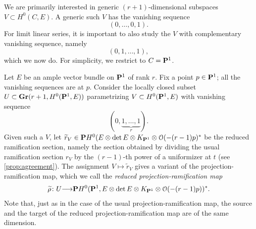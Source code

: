 \documentclass[11pt,reqno]{amsart}
\theoremstyle{plain}
\theoremstyle{definition}
\theoremstyle{remark}
\numberwithin{equation}{section}
\renewcommand{\to}{{\longrightarrow}}
\numberwithin{equation}{section}
\renewcommand{\O}{\mathcal O}
\begin{document}
We are primarily interested in generic $(r+1)$-dimensional subspaces $V \subset H^0(C, E)$.
A generic such $V$ has the vanishing sequence
\[ (0, \dots, 0, 1).\]
For limit linear series, it is important to also study the $V$ with complementary vanishing sequence, namely
\[ (0,1, \dots, 1),\]
which we now do.
For simplicity, we restrict to $C = \P^1$.

Let $E$ be an ample vector bundle on $\P^1$ of rank $r$.
Fix a point $p \in \P^1$; all the vanishing sequences are at $p$.
Consider  the locally closed subset $U \subset \Gr(r+1, H^0(\P^1, E))$ parametrizing $V \subset H^0(\P^1, E)$ with vanishing sequence
\[ (0,\underbrace{1,\dots, 1}_{r}).\]
Given such a $V$, let $\widetilde r_V \in \P H^0(E \otimes \det E \otimes K_{\P^1} \otimes \O(-(r-1)p)^*$ be the reduced ramification section, namely the section obtained by dividing the usual ramification section $r_V$ by the $(r-1)$-th power of a uniformizer at $t$ (see \autoref{prop:agreement}).
The assignment $V \mapsto \widetilde r_V$ gives a variant of the projection-ramification map, which we call the \emph{reduced projection-ramification map}
\begin{equation}\label{eqn:rrd}
  \widetilde \rho \from U \to \P H^0(\P^1, E \otimes \det E \otimes K_{\P^1} \otimes \O(-(r-1)p))^*.
\end{equation}
Note that, just as in the case of the usual projection-ramification map, the source and the target of the reduced projection-ramification map are of the same dimension.
\end{document}
